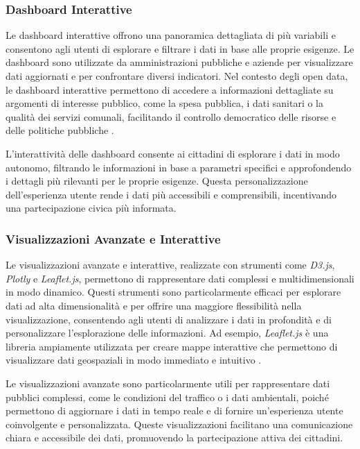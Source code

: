 \subsubsection{Dashboard Interattive}
Le dashboard interattive offrono una panoramica dettagliata di più variabili e consentono agli utenti di esplorare e filtrare i dati in base alle proprie esigenze. Le dashboard sono utilizzate da amministrazioni pubbliche e aziende per visualizzare dati aggiornati e per confrontare diversi indicatori. Nel contesto degli open data, le dashboard interattive permettono di accedere a informazioni dettagliate su argomenti di interesse pubblico, come la spesa pubblica, i dati sanitari o la qualità dei servizi comunali, facilitando il controllo democratico delle risorse e delle politiche pubbliche \cite{Smith2018}.

L'interattività delle dashboard consente ai cittadini di esplorare i dati in modo autonomo, filtrando le informazioni in base a parametri specifici e approfondendo i dettagli più rilevanti per le proprie esigenze. Questa personalizzazione dell’esperienza utente rende i dati più accessibili e comprensibili, incentivando una partecipazione civica più informata.

\subsubsection{Visualizzazioni Avanzate e Interattive}
Le visualizzazioni avanzate e interattive, realizzate con strumenti come \textit{D3.js}, \textit{Plotly} e \textit{Leaflet.js}, permettono di rappresentare dati complessi e multidimensionali in modo dinamico. Questi strumenti sono particolarmente efficaci per esplorare dati ad alta dimensionalità e per offrire una maggiore flessibilità nella visualizzazione, consentendo agli utenti di analizzare i dati in profondità e di personalizzare l'esplorazione delle informazioni. Ad esempio, \textit{Leaflet.js} è una libreria ampiamente utilizzata per creare mappe interattive che permettono di visualizzare dati geospaziali in modo immediato e intuitivo \cite{Wilkinson2021}.

Le visualizzazioni avanzate sono particolarmente utili per rappresentare dati pubblici complessi, come le condizioni del traffico o i dati ambientali, poiché permettono di aggiornare i dati in tempo reale e di fornire un’esperienza utente coinvolgente e personalizzata. Queste visualizzazioni facilitano una comunicazione chiara e accessibile dei dati, promuovendo la partecipazione attiva dei cittadini.

